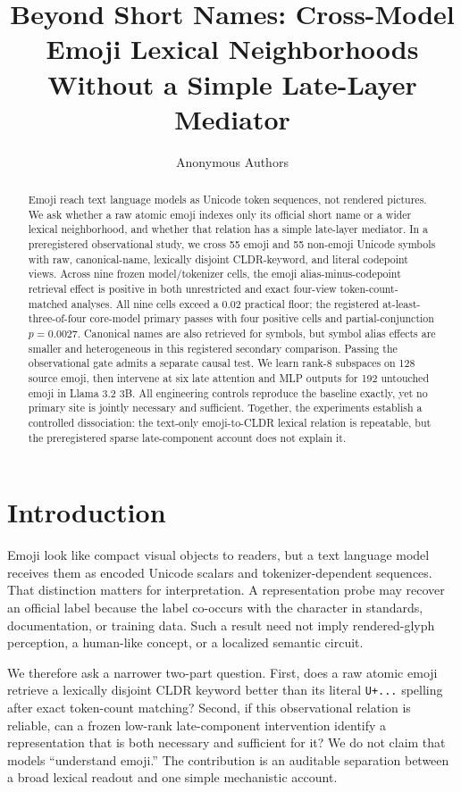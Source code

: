 \documentclass{article}
\title{Beyond Short Names: Cross-Model Emoji Lexical Neighborhoods\\
Without a Simple Late-Layer Mediator}
\author{Anonymous Authors}
\begin{document}
\maketitle

\begin{abstract}
Emoji reach text language models as Unicode token sequences, not rendered
pictures. We ask whether a raw atomic emoji indexes only its official short
name or a wider lexical neighborhood, and whether that relation has a simple
late-layer mediator. In a preregistered observational study, we cross 55 emoji
and 55 non-emoji Unicode symbols with raw, canonical-name, lexically disjoint
CLDR-keyword, and literal codepoint views. Across nine frozen model/tokenizer
cells, the emoji
alias-minus-codepoint retrieval effect is positive in both unrestricted and
exact four-view token-count-matched analyses. All nine cells exceed a 0.02
practical floor; the registered at-least-three-of-four core-model primary
passes with four positive cells and partial-conjunction $p=0.0027$. Canonical
names are also retrieved for symbols, but symbol alias effects are smaller and
heterogeneous in this registered secondary comparison. Passing the
observational gate admits a separate causal test. We learn rank-8 subspaces on
128 source emoji, then intervene at six late attention and MLP outputs for 192
untouched emoji in Llama 3.2 3B. All engineering controls reproduce the
baseline exactly, yet no primary site is jointly necessary and sufficient.
Together, the experiments establish a controlled dissociation: the text-only
emoji-to-CLDR lexical relation is repeatable, but the preregistered sparse
late-component account does not explain it.
\end{abstract}

\section{Introduction}

Emoji look like compact visual objects to readers, but a text language model
receives them as encoded Unicode scalars and tokenizer-dependent sequences.
That distinction matters for interpretation. A representation probe may
recover an official label because the label co-occurs with the character in
standards, documentation, or training data. Such a result need not imply
rendered-glyph perception, a human-like concept, or a localized semantic
circuit.

We therefore ask a narrower two-part question. First, does a raw atomic emoji
retrieve a lexically disjoint CLDR keyword better than its literal
\texttt{U+...} spelling after exact token-count matching? Second, if this
observational relation is reliable, can a frozen low-rank late-component
intervention identify a representation that is both necessary and sufficient
for it? We do not claim that models ``understand emoji.'' The contribution is
an auditable separation between a broad lexical readout and one simple
mechanistic account.
\end{document}
